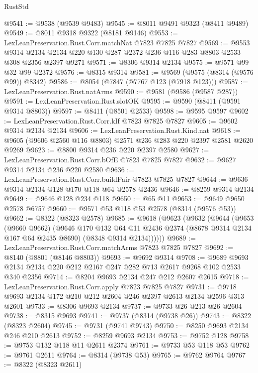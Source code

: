 \begin{lexlean}{RustStd}
\begin{coremodule}
@9541 := @9538 (@9539 @9483)
@9545 := @8011 @9491 @9323 (@8411 @9489)
@9549 := @8011 @9318 @9322 (@8181 @9146)
@9553 := LexLeanPreservation.Rust.Corr.matchNat @7823 @7825 @7827
@9569 := @9553
    @9314
    @2134
    @2134
    @220
    @130
    @287
    @2372
    @236
    @116
    @283
    @8803
    @2533
    @308
    @2356
    @2397
    @9271
@9571 := @8306 @9314 @2134
@9575 := @9571 @99 @32 @99 @2372
@9576 := @8315 @9314
@9581 := @9569 (@9575 (@8314 (@9576 @99)) @8342)
@9586 := @8054 (@7847 (@7767 @123 (@7918 @123)))
@9587 := LexLeanPreservation.Rust.natArms
@9590 := @9581 (@9586 (@9587 @287))
@9591 := LexLeanPreservation.Rust.slotOK
@9595 := @9590 (@8411 (@9591 @9314 @8803))
@9597 := @8411 (@8501 @2533)
@9598 := @9595 @9597
@9602 := LexLeanPreservation.Rust.Corr.kIf @7823 @7825 @7827
@9605 := @9602 @9314 @2134 @2134
@9606 := LexLeanPreservation.Rust.Kind.nat
@9618 := @9605 (@9606 @2560 @116 @8803) @2571 @236 @283 @220 @2397 @2581 @2620 @9269
@9623 := @8800 @9314 @236 @220 @2397 @2580
@9627 := LexLeanPreservation.Rust.Corr.bOfE @7823 @7825 @7827
@9632 := @9627 @9314 @2134 @236 @220 @2580
@9636 := LexLeanPreservation.Rust.Corr.buildPair @7823 @7825 @7827
@9644 := @9636 @9314 @2134 @128 @170 @118 @64 @2578 @2436
@9646 := @8259 @9314 @2134
@9649 := @9646 @128 @234 @118
@9650 := @65 @11
@9653 := @9649 @9650 @2578 @6757
@9660 := @9571 @53 @118 @53 @2578 (@8314 (@9576 @53))
@9662 := @8322 (@8323 @2578)
@9685 := @9618
    (@9623
      (@9632
        (@9644
          (@9653
            (@9660 @9662)
            (@9646
              @170
              @132
              @64
              @11
              @2436
              @2374
              (@8678 @9314 @2134 @167 @64 @2435 @8690)
              (@8348 @9314 @2134))))))
@9689 := LexLeanPreservation.Rust.Corr.matchArms @7823 @7825 @7827
@9692 := @8140 (@8801 (@8146 @8803))
@9693 := @9692 @9314
@9708 := @9689 @9693 @2134 @2134 @220 @212 @2167 @247 @282 @713 @2617 @9268 @102 @2533 @340 @2356
@9714 := @8204 @9693 @2134 @247 @212 @2607 @2615
@9718 := LexLeanPreservation.Rust.Corr.apply @7823 @7825 @7827
@9731 := @9718 @9693 @2134 @172 @210 @212 @2604 @246 @2397 @2613 @2134 @2596 @313 @2601
@9733 := @8306 @9693 @2134
@9737 := @9733 @26 @213 @26 @2604
@9738 := @8315 @9693
@9741 := @9737 (@8314 (@9738 @26))
@9743 := @8322 (@8323 @2604)
@9745 := @9731 (@9741 @9743)
@9750 := @8250 @9693 @2134 @246 @210 @2613
@9752 := @8259 @9693 @2134
@9753 := @9752 @128
@9758 := @9753 @132 @118 @11 @2611 @2374
@9761 := @9733 @53 @118 @53
@9762 := @9761 @2611
@9764 := @8314 (@9738 @53)
@9765 := @9762 @9764
@9767 := @8322 (@8323 @2611)

\end{coremodule}
\end{lexlean}
